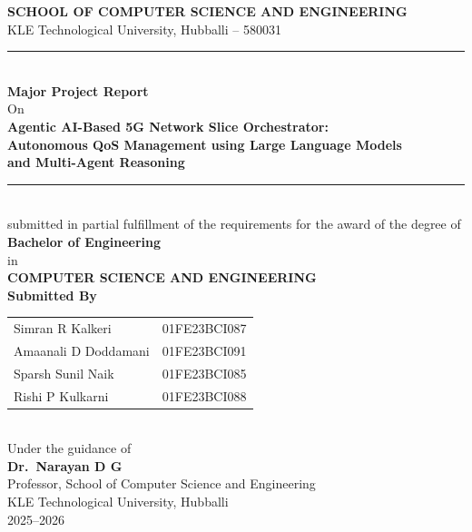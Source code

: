\documentclass[12pt,a4paper]{report}
\begin{document}
\begin{titlepage}
\centering
{\large\bfseries SCHOOL OF COMPUTER SCIENCE AND ENGINEERING}\\[0.3cm]
{\large KLE Technological University, Hubballi -- 580031}\\[1cm]
\rule{\linewidth}{0.5pt}\\[0.4cm]
{\Large\bfseries Major Project Report}\\[0.3cm]
{\large On}\\[0.5cm]
{\LARGE\bfseries Agentic AI-Based 5G Network Slice Orchestrator:\\[0.2cm]
Autonomous QoS Management using Large Language Models\\[0.2cm]
and Multi-Agent Reasoning}\\[0.5cm]
\rule{\linewidth}{0.5pt}\\[0.5cm]
{\normalsize submitted in partial fulfillment of the requirements for the award of the degree of}\\[0.4cm]
{\large\bfseries Bachelor of Engineering}\\
{\normalsize in}\\
{\large\bfseries COMPUTER SCIENCE AND ENGINEERING}\\[1.2cm]
{\normalsize\bfseries Submitted By}\\[0.4cm]
\begin{tabular}{ll}
Simran R Kalkeri       & 01FE23BCI087 \\[4pt]
Amaanali D Doddamani   & 01FE23BCI091 \\[4pt]
Sparsh Sunil Naik      & 01FE23BCI085 \\[4pt]
Rishi P Kulkarni       & 01FE23BCI088 \\
\end{tabular}\\[1.2cm]
{\normalsize Under the guidance of}\\[0.3cm]
{\large\bfseries Dr.\ Narayan D G}\\
{\normalsize Professor, School of Computer Science and Engineering}\\[0.5cm]
{\normalsize KLE Technological University, Hubballi}\\[1cm]
{\large 2025--2026}
\end{titlepage}
\end{document}
